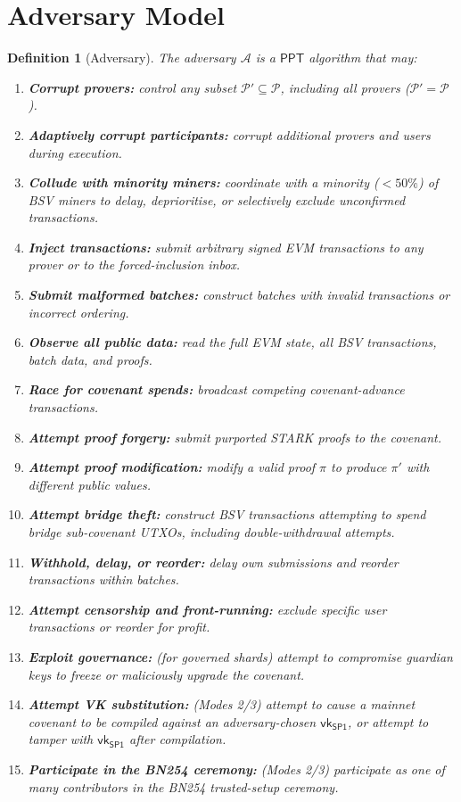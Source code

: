 \documentclass[11pt,a4paper]{article}
\newtheorem{definition}{Definition}[section]
\newcommand{\PPT}{\mathsf{PPT}}
\newcommand{\Adv}{\mathcal{A}}
\newcommand{\SPone}{\mathsf{SP1}}
\newcommand{\vkSP}{\mathsf{vk}_{\SPone}}           %
\begin{document}
\section{Adversary Model}\label{sec:adversary}

\begin{definition}[Adversary]\label{def:adversary}
The adversary $\Adv$ is a $\PPT$ algorithm that may:
\begin{enumerate}[nosep,label=(A\arabic*)]
    \item \textbf{Corrupt provers:} control any subset $\mathcal{P}' \subseteq \mathcal{P}$, including all provers ($\mathcal{P}' = \mathcal{P}$).
    \item \textbf{Adaptively corrupt participants:} corrupt additional provers and users during execution.
    \item \textbf{Collude with minority miners:} coordinate with a minority ($< 50\%$) of BSV miners to delay, deprioritise, or selectively exclude unconfirmed transactions.
    \item \textbf{Inject transactions:} submit arbitrary signed EVM transactions to any prover or to the forced-inclusion inbox.
    \item \textbf{Submit malformed batches:} construct batches with invalid transactions or incorrect ordering.
    \item \textbf{Observe all public data:} read the full EVM state, all BSV transactions, batch data, and proofs.
    \item \textbf{Race for covenant spends:} broadcast competing covenant-advance transactions.
    \item \textbf{Attempt proof forgery:} submit purported STARK proofs to the covenant.
    \item \textbf{Attempt proof modification:} modify a valid proof $\pi$ to produce $\pi'$ with different public values.
    \item \textbf{Attempt bridge theft:} construct BSV transactions attempting to spend bridge sub-covenant UTXOs, including double-withdrawal attempts.
    \item \textbf{Withhold, delay, or reorder:} delay own submissions and reorder transactions within batches.
    \item \textbf{Attempt censorship and front-running:} exclude specific user transactions or reorder for profit.
    \item \textbf{Exploit governance:} (for governed shards) attempt to compromise guardian keys to freeze or maliciously upgrade the covenant.
    \item \textbf{Attempt VK substitution:} (Modes 2/3) attempt to cause a mainnet covenant to be compiled against an adversary-chosen $\vkSP$, or attempt to tamper with $\vkSP$ after compilation.
    \item \textbf{Participate in the BN254 ceremony:} (Modes 2/3) participate as one of many contributors in the BN254 trusted-setup ceremony.
\end{enumerate}


\end{definition}
\end{document}
